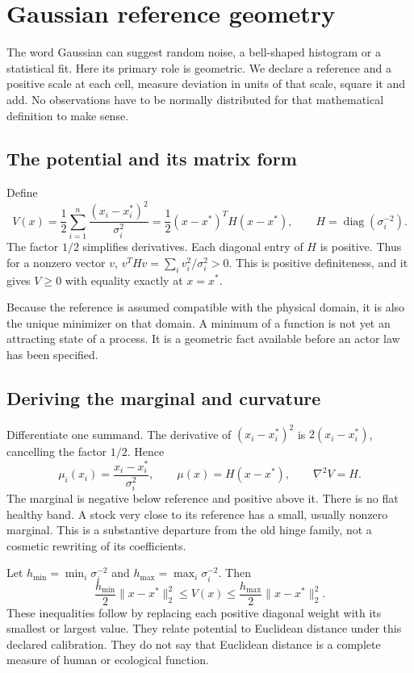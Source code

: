 \chapter{Gaussian reference geometry}\label{ch:geometry}
The word Gaussian can suggest random noise, a bell-shaped histogram or a
statistical fit. Here its primary role is geometric. We declare a reference
and a positive scale at each cell, measure deviation in units of that scale,
square it and add. No observations have to be normally distributed for that
mathematical definition to make sense.

\section{The potential and its matrix form}
Define
\begin{equation}\label{eq:potential}
 V(x)=\frac12\sum_{i=1}^n\frac{(x_i-x_i^*)^2}{\sigma_i^2}
     =\frac12(x-x^*)^T H(x-x^*),
 \qquad H=\operatorname{diag}(\sigma_i^{-2}).
\end{equation}
The factor $1/2$ simplifies derivatives. Each diagonal entry of $H$ is
positive. Thus for a nonzero vector $v$,
$v^THv=\sum_i v_i^2/\sigma_i^2>0$. This is positive definiteness, and it
gives $V\geq0$ with equality exactly at $x=x^*$.

Because the reference is assumed compatible with the physical domain, it is
also the unique minimizer on that domain. A minimum of a function is not
yet an attracting state of a process. It is a geometric fact available
before an actor law has been specified.

\section{Deriving the marginal and curvature}
Differentiate one summand. The derivative of $(x_i-x_i^*)^2$ is
$2(x_i-x_i^*)$, cancelling the factor $1/2$. Hence
\begin{equation}
 \mu_i(x_i)=\frac{x_i-x_i^*}{\sigma_i^2},
 \qquad \mu(x)=H(x-x^*),\qquad \nabla^2V=H.
\end{equation}
The marginal is negative below reference and positive above it. There is
no flat healthy band. A stock very close to its reference has a small,
usually nonzero marginal. This is a substantive departure from the old
hinge family, not a cosmetic rewriting of its coefficients.

Let $h_{\min}=\min_i\sigma_i^{-2}$ and
$h_{\max}=\max_i\sigma_i^{-2}$. Then
\begin{equation}
 \frac{h_{\min}}2\|x-x^*\|_2^2\leq V(x)
 \leq\frac{h_{\max}}2\|x-x^*\|_2^2.
\end{equation}
These inequalities follow by replacing each positive diagonal weight with
its smallest or largest value. They relate potential to Euclidean distance
under this declared calibration. They do not say that Euclidean distance is
a complete measure of human or ecological function.

